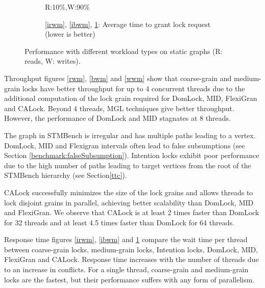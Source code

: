 \begin{figure}[ht]
\begin{subfigure}[b]{.32\textwidth}
		\caption{R:10\%,W:90\%}
		\label{iwwm}
	\end{subfigure}
	\begin{subfigure}[b]{\textwidth}
		\caption*{\ref{irwm}, \ref{ibwm}, \ref{iwwm}: Average time to grant lock request (lower is better)}
	\end{subfigure}



	\caption{Performance with different workload types on static graphs (R: reads, W: writes).}
	\label{staticPerf}
	\end{figure}
Throughput figures \ref{rwm}, \ref{bwm} and \ref{wwm} show that coarse-grain and medium-grain locks have better throughput for up to 4 concurrent threads due to the additional computation of the lock grain required for DomLock, MID, FlexiGran and CALock. Beyond 4 threads, MGL techniques give better throughput. However, the performance of DomLock and MID stagnates at 8 threads.

The graph in STMBench is irregular and has multiple paths leading to a vertex. DomLock, MID and Flexigran intervals often lead to false subsumptions (see Section \ref{benchmark:falseSubsumption}). Intention locks exhibit poor performance due to the high number of paths leading to target vertices from the root of the STMBench hierarchy (see Section\ref{ttc}).

CALock successfully minimizes the size of the lock grains and allows threads to lock disjoint grains in parallel, achieving better scalability than DomLock, MID and FlexiGran.
We observe that CALock is at least 2 times faster than DomLock for 32 threads and at least 4.5 times faster than DomLock for 64 threads.




Response time figures \ref{irwm}, \ref{ibwm} and \ref{iwwm} compare the wait time per thread between coarse-grain locks, medium-grain locks, Intention locks,  DomLock, MID, FlexiGran and CALock.
Response time increases with the number of threads due to an increase in conflicts.
For a single thread, coarse-grain and medium-grain locks are the fastest, but their performance suffers with any form of parallelism. 

